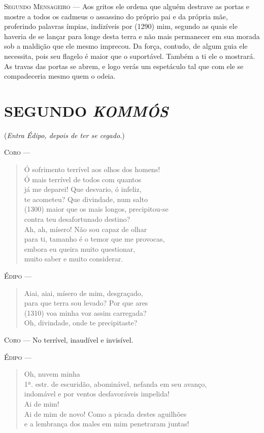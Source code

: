 \textsc{Segundo Mensageiro} --- Aos gritos ele ordena que alguém destrave as portas e mostre a todos os
cadmeus o assassino do próprio pai e da própria mãe, proferindo palavras
ímpias, indizíveis por (1290) mim, segundo as quais ele haveria de se
lançar para longe desta terra e não mais permanecer em sua morada sob a
maldição que ele mesmo imprecou. Da força, contudo, de algum guia ele
necessita, pois seu flagelo é maior que o suportável. Também a ti ele o
mostrará. As travas das portas se abrem, e logo verás um espetáculo tal
que com ele se compadeceria mesmo quem o odeia.


\section{SEGUNDO \emph{KOMMÓS}}

(\emph{Entra Édipo, depois de ter se cegado.})

\textsc{Coro} --- \begin{verse}Ó sofrimento terrível aos olhos dos homens!\\
Ó mais terrível de todos com quantos\\
já me deparei! Que desvario, ó infeliz,\\
te acometeu? Que divindade, num salto\\ (1300)
maior que os mais longos, precipitou-se\\
contra teu desafortunado destino?\\
Ah, ah, mísero! Não sou capaz de olhar\\
para ti, tamanho é o temor que me provocas,\\
embora eu queira muito questionar,\\
muito saber e muito considerar.
\end{verse}

\textsc{Édipo} --- \begin{verse}Aiai, aiai, mísero de mim, desgraçado,\\
para que terra sou levado? Por que ares\\ (1310)
voa minha voz assim carregada?\\
Oh, divindade, onde te precipitaste?
\end{verse}

\textsc{Coro} --- No terrível, inaudível e invisível.

\textsc{Édipo} --- \begin{verse}Oh, nuvem minha\\ 1ª. estr.
de escuridão, abominável, nefanda em seu avanço,\\
indomável e por ventos desfavoráveis impelida!\\
Ai de mim!\\
Ai de mim de novo! Como a picada destes aguilhões\\
e a lembrança dos males em mim penetraram juntas!
\end{verse}

